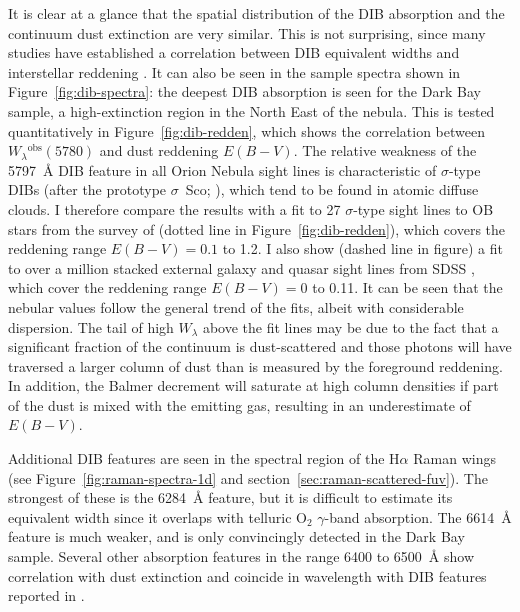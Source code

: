\documentclass[useAMS, usenatbib, a4paper]{mnras}
\newcommand*\chem[1]{\ensuremath{\mathrm{#1}}}
\newcommand\ha{\ensuremath{\text{H}\alpha}}
\newcommand\observed{\ensuremath{^{\text{obs}}}}
\begin{document}
It is clear at a glance that the spatial distribution of the
DIB absorption and the continuum dust extinction are very similar.
This is not surprising, since many studies have established
a correlation between DIB equivalent widths and interstellar reddening
\citep{Friedman:2011a, Kos:2013a, Baron:2015a, Kreowski:2019b}.
It can also be seen in the sample spectra shown in Figure~\ref{fig:dib-spectra}:
the deepest DIB absorption is seen for the Dark Bay sample,
a high-extinction region in the North East of the nebula. 
This is tested quantitatively in Figure~\ref{fig:dib-redden},
which shows the correlation between \(W_\lambda\observed(5780)\)
and dust reddening \(E(B - V)\).
The relative weakness of the \SI{5797}{\angstrom} DIB feature in all
Orion Nebula sight lines is characteristic of \(\sigma\)-type DIBs
(after the prototype \(\sigma\)~Sco; \citealp{Krelowski:1988a}),
which tend to be found in atomic diffuse clouds. 
I therefore compare the results with a fit to 27 \(\sigma\)-type sight lines to
OB stars from the survey of \citet{Kos:2013a} (dotted line in Figure~\ref{fig:dib-redden}),
which covers the reddening range \(E(B - V) = 0.1\) to \num{1.2}.
I also show (dashed line in figure) a fit to over a million stacked external galaxy and quasar sight lines from SDSS \citep{Baron:2015a}, which cover the reddening range
\(E(B - V) = 0\) to \num{0.11}.
It can be seen that the nebular values follow the general trend of the fits,
albeit with considerable dispersion.
The tail of high \(W_\lambda\) above the fit lines may be due to the fact that
a significant fraction of the continuum is dust-scattered and those photons
will have traversed a larger column of dust than is measured by the foreground reddening.
In addition, the Balmer decrement will saturate at high column densities
if part of the dust is mixed with the emitting gas, resulting in an underestimate
of \(E(B - V)\). 

Additional DIB features are seen in the spectral region of the \ha{} Raman wings
(see Figure~\ref{fig:raman-spectra-1d} and section~\ref{sec:raman-scattered-fuv}).
The strongest of these is the \SI{6284}{\angstrom} feature,
but it is difficult to estimate its equivalent width
since it overlaps with telluric \chem{O_2} \(\gamma\)-band absorption.
The \SI{6614}{\angstrom} feature \citep{Bernstein:2018a} is much weaker,
and is only convincingly detected in the Dark Bay sample.
Several other absorption features in the range \num{6400} to \SI{6500}{\angstrom}
show correlation with dust extinction and coincide in
wavelength with DIB features reported in \citet{Galazutdinov:2000a}. 
\end{document}
